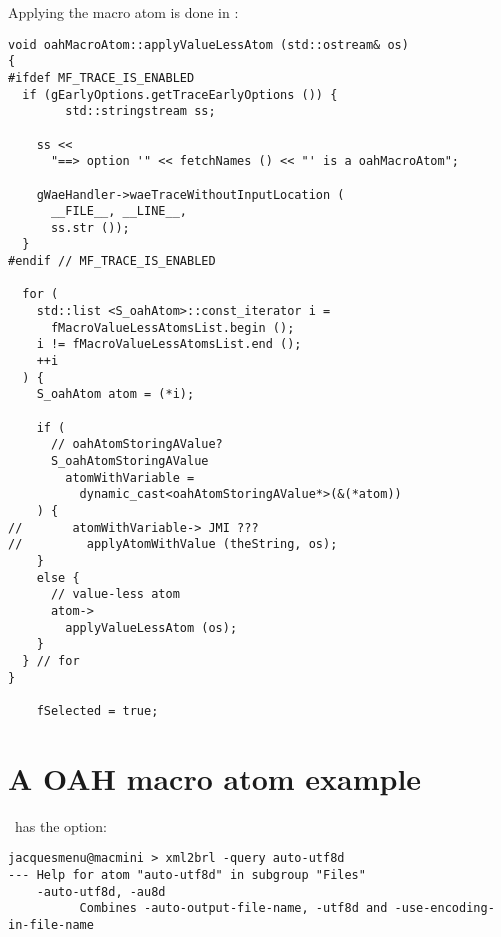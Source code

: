 Applying the macro atom is done in :
\begin{lstlisting}[language=CPlusPlus]
void oahMacroAtom::applyValueLessAtom (std::ostream& os)
{
#ifdef MF_TRACE_IS_ENABLED
  if (gEarlyOptions.getTraceEarlyOptions ()) {
		std::stringstream ss;

    ss <<
      "==> option '" << fetchNames () << "' is a oahMacroAtom";

    gWaeHandler->waeTraceWithoutInputLocation (
      __FILE__, __LINE__,
      ss.str ());
  }
#endif // MF_TRACE_IS_ENABLED

  for (
    std::list <S_oahAtom>::const_iterator i =
      fMacroValueLessAtomsList.begin ();
    i != fMacroValueLessAtomsList.end ();
    ++i
  ) {
    S_oahAtom atom = (*i);

    if (
      // oahAtomStoringAValue?
      S_oahAtomStoringAValue
        atomWithVariable =
          dynamic_cast<oahAtomStoringAValue*>(&(*atom))
    ) {
//       atomWithVariable-> JMI ???
//         applyAtomWithValue (theString, os);
    }
    else {
      // value-less atom
      atom->
        applyValueLessAtom (os);
    }
  } // for
}

	fSelected = true;
\end{lstlisting}


\section{A OAH macro atom example}

\xmlToBrl\ has the  option:
\begin{lstlisting}[language=Terminal]
jacquesmenu@macmini > xml2brl -query auto-utf8d
--- Help for atom "auto-utf8d" in subgroup "Files"
    -auto-utf8d, -au8d
          Combines -auto-output-file-name, -utf8d and -use-encoding-in-file-name
\end{lstlisting}


